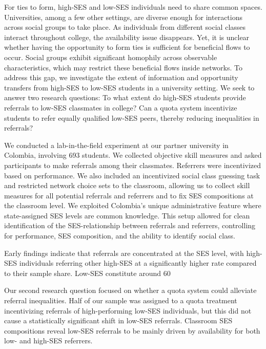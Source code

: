 \documentclass[11pt,a4paper,oneside]{article}
\begin{document}
For ties to form, high-SES and low-SES individuals need to share common spaces. Universities, among a few other settings, are diverse enough for interactions across social groups to take place. As individuals from different social classes interact throughout college, the availability issue disappears. Yet, it is unclear whether having the opportunity to form ties is sufficient for beneficial flows to occur. Social groups exhibit significant homophily across observable characteristics, which may restrict these beneficial flows inside networks. To address this gap, we investigate the extent of information and opportunity transfers from high-SES to low-SES students in a university setting. We seek to answer two research questions: To what extent do high-SES students provide referrals to low-SES classmates in college? Can a quota system incentivize students to refer equally qualified low-SES peers, thereby reducing inequalities in referrals?

We conducted a lab-in-the-field experiment at our partner university in Colombia, involving 693 students. We collected objective skill measures and asked participants to make referrals among their classmates. Referrers were incentivized based on performance. We also included an incentivized social class guessing task and restricted network choice sets to the classroom, allowing us to collect skill measures for all potential referrals and referrers and to fix SES compositions at the classroom level. We exploited Colombia's unique administrative feature where state-assigned SES levels are common knowledge. This setup allowed for clean identification of the SES-relationship between referrals and referrers, controlling for performance, SES composition, and the ability to identify social class.

Early findings indicate that referrals are concentrated at the SES level, with high-SES individuals referring other high-SES at a significantly higher rate compared to their sample share. Low-SES constitute around 60%

Our second research question focused on whether a quota system could alleviate referral inequalities. Half of our sample was assigned to a quota treatment incentivizing referrals of high-performing low-SES individuals, but this did not cause a statistically significant shift in low-SES referrals. Classroom SES compositions reveal low-SES referrals to be mainly driven by availability for both low- and high-SES referrers.
\end{document}
